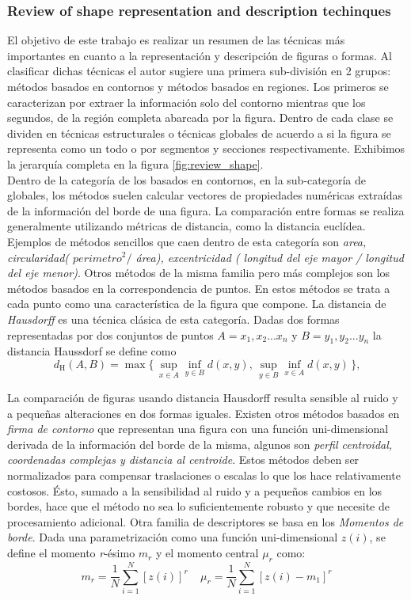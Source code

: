 	\subsubsection{Review of shape representation and description techinques \cite{Zhang02}}
El objetivo de este trabajo es realizar un resumen de las t\'ecnicas m\'as 
importantes en cuanto a la representaci\'on y descripci\'on de figuras o 
formas.
Al clasificar dichas t\'ecnicas el autor sugiere una primera 
sub-divisi\'on en 2 grupos: m\'etodos basados en contornos y m\'etodos basados en regiones. 
Los primeros se caracterizan por extraer  la informaci\'on 
solo del contorno mientras que los segundos, de la regi\'on completa abarcada
por la figura. Dentro de cada clase se dividen en t\'ecnicas 
estructurales o t\'ecnicas globales de acuerdo a si la figura se 
representa como un todo o por segmentos y secciones respectivamente. 
Exhibimos la jerarqu\'ia completa en la figura \ref{fig:review_shape}.\\
\indent Dentro de la categor\'ia de los basados en contornos, en la sub-categor\'ia de globales, los m\'etodos suelen calcular vectores de 
propiedades num\'ericas extra\'idas de la informaci\'on del borde de una 
figura. La comparaci\'on entre formas se realiza 
generalmente utilizando m\'etricas de distancia, como la distancia eucl\'idea. Ejemplos de m\'etodos sencillos que caen dentro de esta 
categor\'ia son \textit{area, circularidad( $perimetro^2 /$ \textit{\'area}), 
excentricidad ( longitud del eje mayor / longitud del eje menor)}. Otros m\'etodos 
de la misma familia pero m\'as complejos son los m\'etodos basados en la correspondencia de puntos. En estos m\'etodos se trata a cada punto como una caracter\'istica de la figura que compone. La distancia de \textit{ Hausdorff} es una t\'ecnica cl\'asica de esta categor\'ia. Dadas dos formas representadas
por dos conjuntos de puntos $A={x_1,x_2...x_n}$ y $B={y_1,y_2...y_n}$ la distancia Haussdorf se define como 
\[
	 d_{\mathrm H}(A,B) = \max\{\,\sup_{x \in A} \inf_{y \in B} d(x,y),\, \sup_{y \in B} \inf_{x \in A} d(x,y)\,\}\mbox{,}
\] 

La comparaci\'on de figuras usando distancia Hausdorff resulta sensible 
al ruido y a peque\~nas alteraciones en dos formas iguales. Existen otros m\'etodos basados
en \textit{firma de contorno} que  representan una figura con una 
funci\'on uni-dimensional derivada de la informaci\'on del borde de la 
misma, 
algunos son \textit{perfil centroidal, coordenadas complejas y distancia al centroide}. Estos m\'etodos deben ser normalizados para compensar
traslaciones o escalas lo que los hace relativamente costosos. \'Esto, sumado a la sensibilidad al ruido y a peque\~nos cambios en los bordes, hace que el m\'etodo 
no sea lo suficientemente robusto y que necesite de procesamiento adicional. Otra familia de descriptores se basa en los 
\textit{Momentos de borde}. Dada una parametrizaci\'on como una funci\'on 
uni-dimensional $z (i)$, se define el momento \textit{r}-\'esimo \textit{$m_r$} 
y el momento central $\mu_r$ como:
\[
	m_r=\frac{1}{N} \sum_{i=1}^{N}{[z(i)]^r}\ \ \ \ \
	\mu_r=\frac{1}{N} \sum_{i=1}^{N}{[z(i) - m_1]^r}
\]

